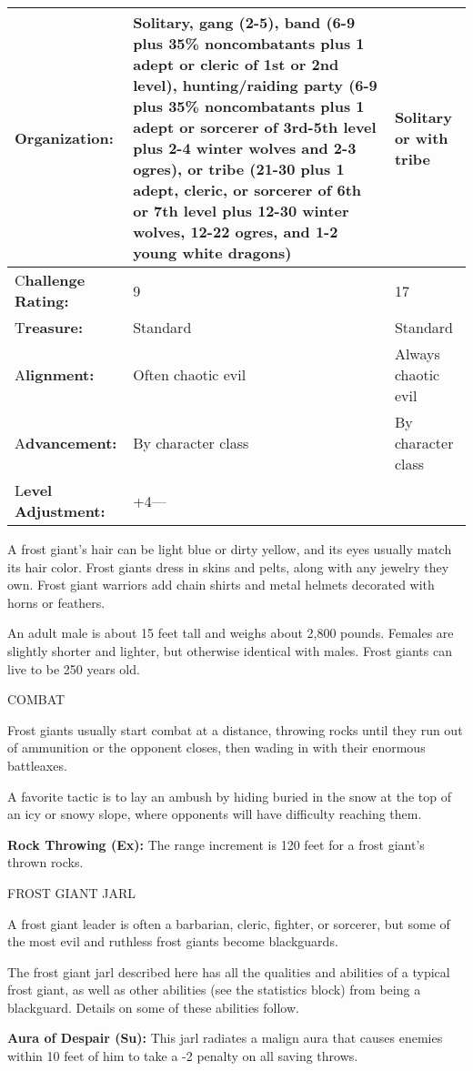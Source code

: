 \documentclass{article}
\begin{document}
\begin{tabular}{|>{\raggedright}p{47pt}|>{\raggedright}p{133pt}|>{\raggedright}p{133pt}|}
\hline
O\textbf{rganization:} & Solitary, gang (2-5), band (6-9 plus 35\% noncombatants 
plus 1 adept or cleric of 1st or 2nd level), hunting/raiding party (6-9 plus 35\% 
noncombatants plus 1 adept or sorcerer of 3rd-5th level plus 2-4 winter wolves 
and 2-3 ogres), or tribe (21-30 plus 1 adept, cleric, or sorcerer of 6th or 7th 
level plus 12-30 winter wolves, 12-22 ogres, and 1-2 young white dragons) & Solitary 
or with tribe\tabularnewline
\hline
C\textbf{hallenge Rating:} & 9 & 17\tabularnewline
\hline
T\textbf{reasure:} & Standard & Standard\tabularnewline
\hline
A\textbf{lignment:} & Often chaotic evil & Always chaotic evil\tabularnewline
\hline
A\textbf{dvancement:} & By character class & By character class\tabularnewline
\hline
L\textbf{evel Adjustment:} & +4--- & \tabularnewline
\hline
\end{tabular}

A frost giant's hair can be light blue or dirty yellow, and its eyes usually match 
its hair color. Frost giants dress in skins and pelts, along with any jewelry they 
own. Frost giant warriors add chain shirts and metal helmets decorated with horns 
or feathers.

An adult male is about 15 feet tall and weighs about 2,800 pounds. Females are 
slightly shorter and lighter, but otherwise identical with males. Frost giants 
can live to be 250 years old.

COMBAT

Frost giants usually start combat at a distance, throwing rocks until they run 
out of ammunition or the opponent closes, then wading in with their enormous battleaxes.

A favorite tactic is to lay an ambush by hiding buried in the snow at the top of 
an icy or snowy slope, where opponents will have difficulty reaching them.

\textbf{Rock Throwing (Ex): }The range increment is 120 feet for a frost giant's 
thrown rocks.

\vspace{12pt}
FROST GIANT JARL

A frost giant leader is often a barbarian, cleric, fighter, or sorcerer, but some 
of the most evil and ruthless frost giants become blackguards.

The frost giant jarl described here has all the qualities and abilities of a typical 
frost giant, as well as other abilities (see the statistics block) from being a 
blackguard. Details on some of these abilities follow.

\textbf{Aura of Despair (Su):} This jarl radiates a malign aura that causes enemies 
within 10 feet of him to take a -2 penalty on all saving throws.
\end{document}
